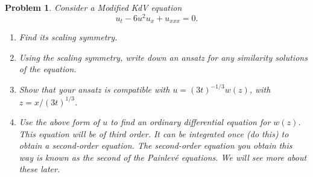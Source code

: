\documentclass[12pt]{report}
\newtheorem{problem}{Problem}
\begin{document}
\newpage



\begin{problem}
    Consider a Modified KdV equation
\[
u_t-6 u^2 u_x+u_{xxx}=0.
\]
\begin{enumerate}

\item[{\bf a.}] Find its scaling symmetry.

\item[{\bf b.}] Using the scaling symmetry, write down an ansatz for any
similarity solutions of the equation.

\item[{\bf c.}] Show that your ansatz is compatible with
 $u=(3t)^{-1/3}w(z)$, with $z=x/(3t)^{1/3}$.

\item[{\bf d.}] Use the above form of $u$ to find an ordinary differential
equation for $w(z)$. This equation will be of third order. It can be
integrated once (do this) to obtain a second-order equation. The
second-order equation you obtain this way is known as the second of
the Painlev\'e equations. We will see more about these later.
\end{enumerate}
\end{problem}
\end{document}
